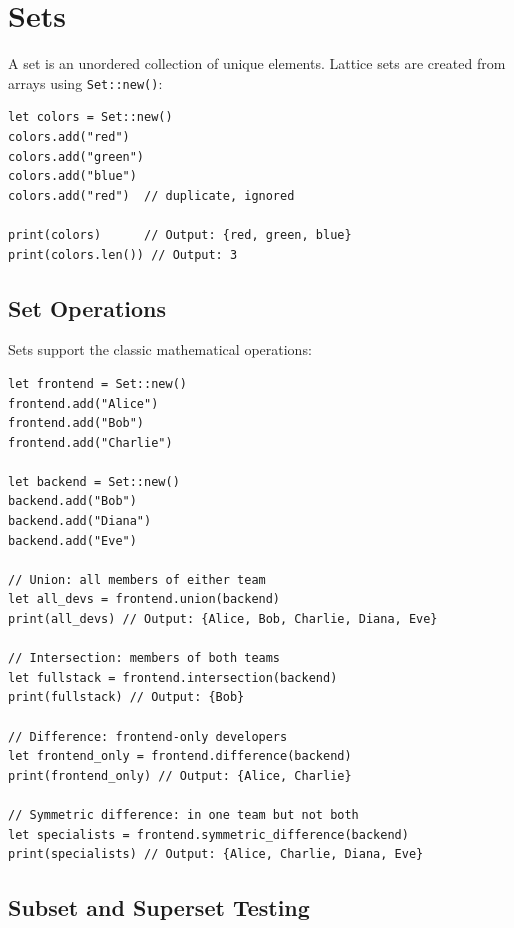 \section{Sets}\label{sec:sets}

A set is an unordered collection of unique elements. Lattice sets are created from arrays using \lstinline|Set::new()|:

\begin{lstlisting}[language=Lattice, caption={Creating sets}]
let colors = Set::new()
colors.add("red")
colors.add("green")
colors.add("blue")
colors.add("red")  // duplicate, ignored

print(colors)      // Output: {red, green, blue}
print(colors.len()) // Output: 3
\end{lstlisting}

\subsection{Set Operations}\label{sec:set-operations}

Sets support the classic mathematical operations:

\begin{lstlisting}[language=Lattice, caption={Set operations}]
let frontend = Set::new()
frontend.add("Alice")
frontend.add("Bob")
frontend.add("Charlie")

let backend = Set::new()
backend.add("Bob")
backend.add("Diana")
backend.add("Eve")

// Union: all members of either team
let all_devs = frontend.union(backend)
print(all_devs) // Output: {Alice, Bob, Charlie, Diana, Eve}

// Intersection: members of both teams
let fullstack = frontend.intersection(backend)
print(fullstack) // Output: {Bob}

// Difference: frontend-only developers
let frontend_only = frontend.difference(backend)
print(frontend_only) // Output: {Alice, Charlie}

// Symmetric difference: in one team but not both
let specialists = frontend.symmetric_difference(backend)
print(specialists) // Output: {Alice, Charlie, Diana, Eve}
\end{lstlisting}

\subsection{Subset and Superset Testing}\label{sec:subset-superset}

